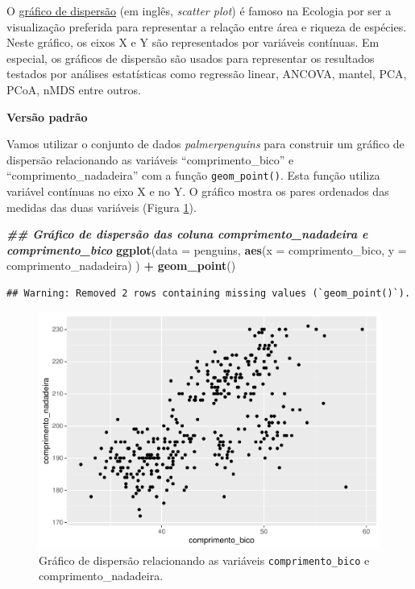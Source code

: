 \documentclass[
]{article}
\newenvironment{Shaded}{\begin{snugshade}}{\end{snugshade}}
\newcommand{\AttributeTok}[1]{\textcolor[rgb]{0.13,0.29,0.53}{#1}}
\newcommand{\DocumentationTok}[1]{\textcolor[rgb]{0.56,0.35,0.01}{\textbf{\textit{#1}}}}
\newcommand{\FunctionTok}[1]{\textcolor[rgb]{0.13,0.29,0.53}{\textbf{#1}}}
\newcommand{\NormalTok}[1]{#1}
\newcommand{\SpecialCharTok}[1]{\textcolor[rgb]{0.81,0.36,0.00}{\textbf{#1}}}
\begin{document}
O \href{https://datavizproject.com/data-type/scatter-plot/}{gráfico de dispersão} (em inglês, \emph{scatter plot}) é famoso na Ecologia por ser a visualização preferida para representar a relação entre área e riqueza de espécies. Neste gráfico, os eixos X e Y são representados por variáveis contínuas. Em especial, os gráficos de dispersão são usados para representar os resultados testados por análises estatísticas como regressão linear, ANCOVA, mantel, PCA, PCoA, nMDS entre outros.

\textbf{Versão padrão}

Vamos utilizar o conjunto de dados \emph{palmerpenguins} para construir um gráfico de dispersão relacionando as variáveis ``comprimento\_bico'' e ``comprimento\_nadadeira'' com a função \texttt{geom\_point()}. Esta função utiliza variável contínuas no eixo X e no Y. O gráfico mostra os pares ordenados das medidas das duas variáveis (Figura \ref{fig:fig-scatter}).

\begin{Shaded}
\begin{Highlighting}[]
\DocumentationTok{\#\# Gráfico de dispersão das coluna comprimento\_nadadeira e comprimento\_bico}
\FunctionTok{ggplot}\NormalTok{(}\AttributeTok{data =}\NormalTok{ penguins, }
       \FunctionTok{aes}\NormalTok{(}\AttributeTok{x =}\NormalTok{ comprimento\_bico, }\AttributeTok{y =}\NormalTok{ comprimento\_nadadeira)}
\NormalTok{       ) }\SpecialCharTok{+}
    \FunctionTok{geom\_point}\NormalTok{()}
\end{Highlighting}
\end{Shaded}

\begin{verbatim}
## Warning: Removed 2 rows containing missing values (`geom_point()`).
\end{verbatim}

\begin{figure}
\centering
\includegraphics{epr_files/figure-latex/fig-scatter-1.pdf}
\caption{\label{fig:fig-scatter}Gráfico de dispersão relacionando as variáveis \texttt{comprimento\_bico} e comprimento\_nadadeira.}
\end{figure}
\end{document}
